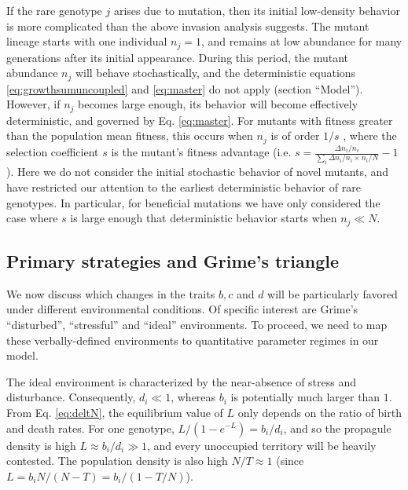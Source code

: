 \documentclass[11pt]{article}
\begin{document}
If the rare genotype $j$ arises due to mutation, then its initial low-density behavior is more complicated than the above invasion analysis suggests. The mutant lineage starts with one individual $n_j=1$, and remains at low abundance for many generations after its initial appearance. During this period, the mutant abundance $n_j$ will behave stochastically, and the deterministic equations \eqref{eq:growthsumuncoupled} and \eqref{eq:master} do not apply (section ``Model''). However, if $n_j$ becomes large enough, its behavior will become effectively deterministic, and governed by Eq. \eqref{eq:master}. For mutants with fitness greater than the population mean fitness, this occurs when $n_j$ is of order $1/s$ \citep{desai_2007}, where the selection coefficient $s$ is the mutant's fitness advantage (i.e. $s=\frac{\Delta n_i/n_i}{\sum_i\Delta n_i/n_i\times n_i/N}-1$). Here we do not consider the initial stochastic behavior of novel mutants, and have restricted our attention to the earliest deterministic behavior of rare genotypes. In particular, for beneficial mutations we have only considered the case where $s$ is large enough that deterministic behavior starts when $n_j \ll N$.

\subsection*{Primary strategies and Grime's triangle}

We now discuss which changes in the traits $b, c$ and $d$ will be particularly favored under different environmental conditions. Of specific interest are Grime's ``disturbed'', ``stressful'' and ``ideal'' environments. To proceed, we need to map these verbally-defined environments to quantitative parameter regimes in our model. 

The ideal environment is characterized by the near-absence of stress and disturbance. Consequently, $d_i\ll 1$, whereas $b_i$ is potentially much larger than $1$. From Eq. \eqref{eq:deltN}, the equilibrium value of $L$ only depends on the ratio of birth and death rates. For one genotype, $L/(1-e^{-L})=b_i/d_i$, and so the propagule density is high $L\approx b_i/d_i\gg 1$, and every unoccupied territory will be heavily contested. The population density is also high $N/T\approx 1$ (since $L=b_iN/(N-T)=b_i/(1-T/N)$). 
\end{document}
